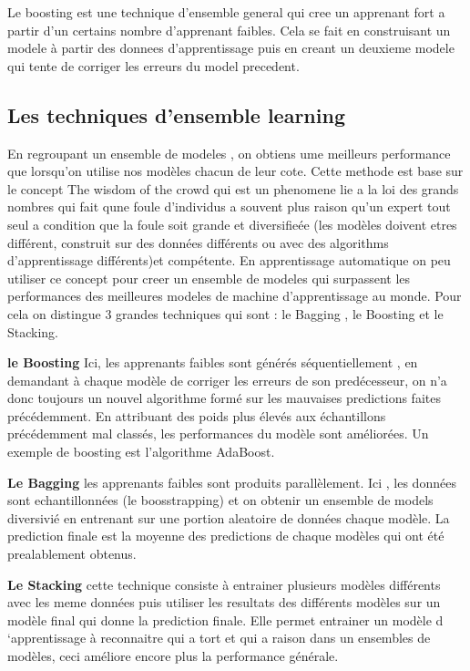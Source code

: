 \documentclass[french,a4paper,12pt]{article}
\begin{document}
 \quad Le boosting est une technique d’ensemble general qui cree un apprenant fort a partir d’un certains nombre d’apprenant faibles. Cela se fait en construisant un modele à partir des donnees d’apprentissage puis en creant un deuxieme modele qui tente de corriger les erreurs du model precedent. 

\subsection{ Les techniques d'ensemble learning}

\quad En regroupant un ensemble de modeles , on obtiens ume meilleurs performance que lorsqu’on utilise nos modèles chacun de leur cote. Cette methode est base sur le concept The wisdom of the crowd qui est un phenomene lie a la loi des grands nombres qui fait qune foule d’individus a souvent plus raison qu’un expert tout seul  a condition que la foule soit grande et diversifieée (les modèles doivent etres différent, construit sur des données différents ou avec des algorithms d’apprentissage différents)et compétente. En apprentissage automatique on peu  utiliser ce concept pour creer un ensemble de modeles qui surpassent les performances des meilleures modeles de machine d’apprentissage au monde\citep{ens}. Pour cela on distingue 3 grandes techniques qui sont : le Bagging , le Boosting et le Stacking.




\textbf{le Boosting} 
\quad Ici, les apprenants faibles sont générés séquentiellement  , en demandant à chaque modèle de corriger les erreurs de son predécesseur, on n’a donc toujours un nouvel algorithme formé sur les mauvaises predictions faites précédemment\citep{ens}. En attribuant des poids plus élevés aux échantillons précédemment mal classés, les performances du modèle sont améliorées. Un exemple de boosting est l'algorithme AdaBoost.

\textbf{Le Bagging} 
\quad les apprenants faibles sont produits parallèlement. Ici , les données sont echantillonnées (le boosstrapping) et on obtenir un ensemble de models diversivié en entrenant sur une portion aleatoire de données chaque modèle. La prediction finale est la moyenne des predictions de chaque modèles qui ont été prealablement obtenus. 

\textbf{Le Stacking}
\quad cette technique consiste à entrainer plusieurs modèles différents avec les meme données puis utiliser les resultats des différents modèles  sur un modèle final qui donne la prediction finale. Elle permet entrainer un modèle d ‘apprentissage à reconnaitre qui a tort et qui a raison dans un ensembles de modèles, ceci améliore encore plus la performance générale. 
\end{document}
